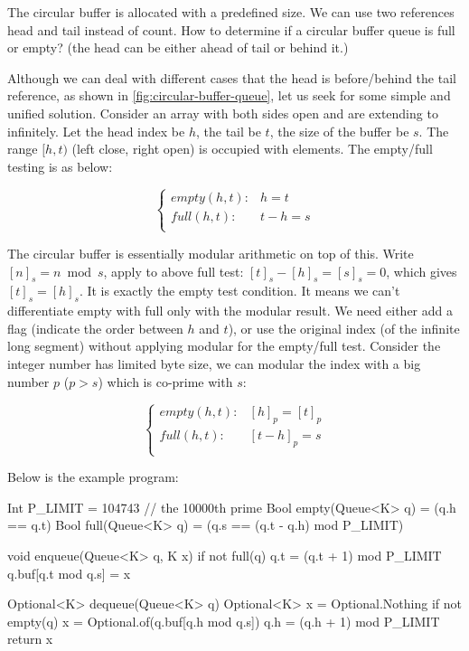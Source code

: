 \documentclass[b5paper]{article}
\begin{document}
\begin{Answer}[ref = {ex:buffered-queue}]
The circular buffer is allocated with a predefined size. We can use two references head and tail instead of count. How to determine if a circular buffer queue is full or empty? (the head can be either ahead of tail or behind it.)

Although we can deal with different cases that the head is before/behind the tail reference, as shown in \cref{fig:circular-buffer-queue}, let us seek for some simple and unified solution. Consider an array with both sides open and are extending to infinitely. Let the head index be $h$, the tail be $t$, the size of the buffer be $s$. The range $[h, t)$ (left close, right open) is occupied with elements. The empty/full testing is as below:

\[
\begin{cases}
empty(h, t): & h = t  \\
full(h, t): & t - h = s \\
\end{cases}
\]

The circular buffer is essentially modular arithmetic on top of this. Write $[n]_s = n \bmod s$, apply to above full test: $[t]_s - [h]_s = [s]_s = 0$, which gives $[t]_s = [h]_s$. It is exactly the empty test condition. It means we can't differentiate empty with full only with the modular result. We need either add a flag (indicate the order between $h$ and $t$), or use the original index (of the infinite long segment) without applying modular for the empty/full test. Consider the integer number has limited byte size, we can modular the index with a big number $p$ ($p > s$) which is co-prime with $s$:

\[
\begin{cases}
empty(h, t): & [h]_p = [t]_p  \\
full(h, t): & [t - h]_p = s \\
\end{cases}
\]

Below is the example program:

\begin{Bourbaki}
Int P_LIMIT = 104743 // the 10000th prime
Bool empty(Queue<K> q) = (q.h == q.t)
Bool full(Queue<K> q) = (q.s == (q.t - q.h) mod P_LIMIT)

void enqueue(Queue<K> q, K x) {
    if not full(q) {
        q.t = (q.t + 1) mod P_LIMIT
        q.buf[q.t mod q.s] = x
    }
}

Optional<K> dequeue(Queue<K> q) {
    Optional<K> x = Optional.Nothing
    if not empty(q) {
        x = Optional.of(q.buf[q.h mod q.s])
        q.h = (q.h + 1) mod P_LIMIT
    }
    return x
}
\end{Bourbaki}
\end{Answer}
\end{document}
